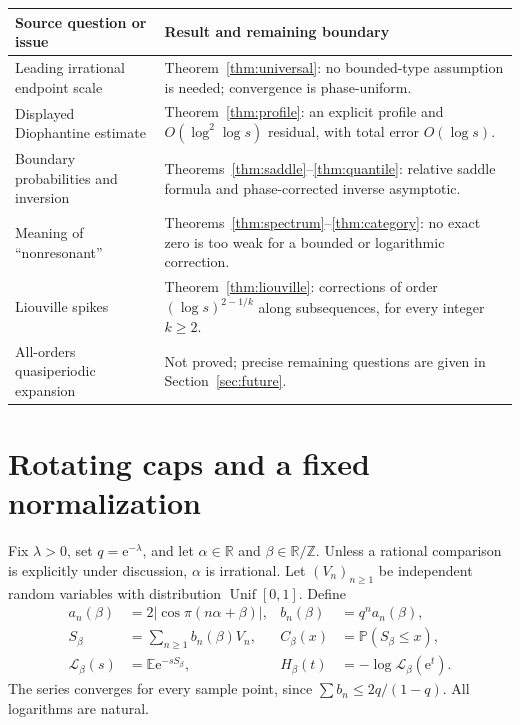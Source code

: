 \documentclass[11pt,a4paper]{article}
\theoremstyle{definition}
\theoremstyle{remark}\newtheorem{remark}[theorem]{Remark}
\newcommand{\R}{\mathbb R}
\newcommand{\T}{\mathbb R/\mathbb Z}
\newcommand{\PP}{\mathbb P}
\newcommand{\EE}{\mathbb E}
\newcommand{\Unif}{\operatorname{Unif}}
\newcommand{\LL}{\mathcal L}
\newcommand{\e}{\mathrm e}
\begin{document}
\begin{center}
\small
\begin{tabularx}{\textwidth}{@{}>{\raggedright\arraybackslash}p{}>{\raggedright\arraybackslash}X@{}}
\toprule
Source question or issue & Result and remaining boundary \\
\midrule
Leading irrational endpoint scale & Theorem~\ref{thm:universal}: no bounded-type
assumption is needed; convergence is phase-uniform. \\
Displayed Diophantine estimate & Theorem~\ref{thm:profile}: an explicit profile
and $O(\log^2\log s)$ residual, with total error $O(\log s)$. \\
Boundary probabilities and inversion & Theorems~\ref{thm:saddle}--\ref{thm:quantile}:
relative saddle formula and phase-corrected inverse asymptotic. \\
Meaning of ``nonresonant'' & Theorems~\ref{thm:spectrum}--\ref{thm:category}:
no exact zero is too weak for a bounded or logarithmic correction. \\
Liouville spikes & Theorem~\ref{thm:liouville}: corrections of order
$(\log s)^{2-1/k}$ along subsequences, for every integer $k\ge2$. \\
All-orders quasiperiodic expansion & Not proved; precise remaining questions
are given in Section~\ref{sec:future}. \\
\bottomrule
\end{tabularx}
\end{center}

\section{Rotating caps and a fixed normalization}
\label{sec:normalization}

Fix $\lambda>0$, set $q=\e^{-\lambda}$, and let $\alpha\in\R$ and
$\beta\in\T$.  Unless a rational comparison is explicitly under discussion,
$\alpha$ is irrational.  Let $(V_n)_{n\ge1}$ be independent random variables
with distribution $\Unif[0,1]$.  Define
\begin{align}
 a_n(\beta)&=2|\cos\pi(n\alpha+\beta)|, &
 b_n(\beta)&=q^n a_n(\beta),\label{eq:weights}\\
 S_\beta&=\sum_{n\ge1}b_n(\beta)V_n, &
 C_\beta(x)&=\PP(S_\beta\le x),\label{eq:S}\\
 \LL_\beta(s)&=\EE\e^{-sS_\beta}, &
 H_\beta(t)&=-\log\LL_\beta(\e^t).
 \label{eq:H}
\end{align}
The series converges for every sample point, since
$\sum b_n\le2q/(1-q)$.  All logarithms are natural.
\end{document}
